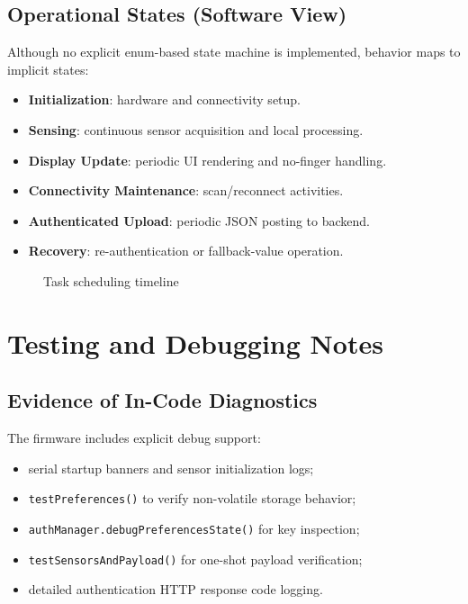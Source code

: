 \documentclass[12pt,a4paper]{report}
\begin{document}
\subsection{Operational States (Software View)}
Although no explicit enum-based state machine is implemented, behavior maps to implicit states:
\begin{itemize}
  \item \textbf{Initialization}: hardware and connectivity setup.
  \item \textbf{Sensing}: continuous sensor acquisition and local processing.
  \item \textbf{Display Update}: periodic UI rendering and no-finger handling.
  \item \textbf{Connectivity Maintenance}: scan/reconnect activities.
  \item \textbf{Authenticated Upload}: periodic JSON posting to backend.
  \item \textbf{Recovery}: re-authentication or fallback-value operation.
\end{itemize}

\begin{figure}[H]
\centering
{}
\caption{Task scheduling timeline}
\label{fig:task-timeline}
\end{figure}

\section{Testing and Debugging Notes}
\subsection{Evidence of In-Code Diagnostics}
The firmware includes explicit debug support:
\begin{itemize}
  \item serial startup banners and sensor initialization logs;
  \item \texttt{testPreferences()} to verify non-volatile storage behavior;
  \item \texttt{authManager.debugPreferencesState()} for key inspection;
  \item \texttt{testSensorsAndPayload()} for one-shot payload verification;
  \item detailed authentication HTTP response code logging.
\end{itemize}
\end{document}
